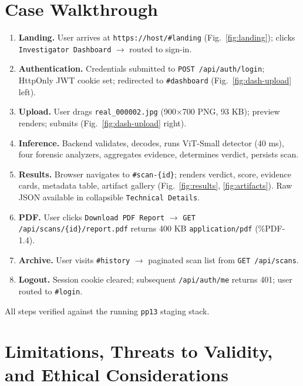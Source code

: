 \documentclass[10pt,conference,compsoc]{IEEEtran}
\begin{document}
\section{Case Walkthrough}
\label{sec:walkthrough}

\begin{enumerate}
  \item \textbf{Landing.} User arrives at \texttt{https://host/\#landing} (Fig.~\ref{fig:landing}); clicks \texttt{Investigator Dashboard} $\to$ routed to sign-in.
  \item \textbf{Authentication.} Credentials submitted to \texttt{POST /api/auth/login}; HttpOnly JWT cookie set; redirected to \texttt{\#dashboard} (Fig.~\ref{fig:dash-upload} left).
  \item \textbf{Upload.} User drags \texttt{real\_000002.jpg} (900$\times$700 PNG, 93 KB); preview renders; submits (Fig.~\ref{fig:dash-upload} right).
  \item \textbf{Inference.} Backend validates, decodes, runs ViT-Small detector (40 ms), four forensic analyzers, aggregates evidence, determines verdict, persists scan.
  \item \textbf{Results.} Browser navigates to \texttt{\#scan-\{id\}}; renders verdict, score, evidence cards, metadata table, artifact gallery (Fig.~\ref{fig:results}, \ref{fig:artifacts}). Raw JSON available in collapsible \texttt{Technical Details}.
  \item \textbf{PDF.} User clicks \texttt{Download PDF Report} $\to$ \texttt{GET /api/scans/\{id\}/report.pdf} returns 400 KB \texttt{application/pdf} (\%PDF-1.4).
  \item \textbf{Archive.} User visits \texttt{\#history} $\to$ paginated scan list from \texttt{GET /api/scans}.
  \item \textbf{Logout.} Session cookie cleared; subsequent \texttt{/api/auth/me} returns 401; user routed to \texttt{\#login}.
\end{enumerate}
All steps verified against the running \texttt{pp13} staging stack.

\section{Limitations, Threats to Validity, and Ethical Considerations}
\label{sec:limitations}
\end{document}
